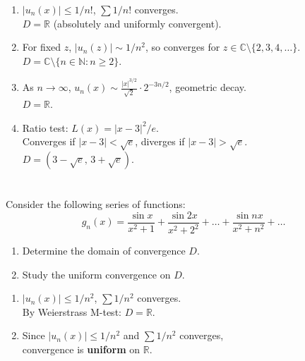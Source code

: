 \documentclass[12pt]{article}
\begin{document}
\begin{correctionbox}
\begin{enumerate}
    \item $|u_n(x)|\leq 1/n!$, $\sum 1/n!$ converges. \\
    $D = \mathbb{R}$ (absolutely and uniformly convergent).

    \item For fixed $z$, $|u_n(z)|\sim 1/n^2$, so converges for $z\in\mathbb{C}\setminus\{2,3,4,\dots\}$. \\
    $D = \mathbb{C}\setminus\{n\in\mathbb{N} : n\geq2\}$.

    \item As $n\to\infty$, $u_n(x) \sim \frac{|x|^{3/2}}{\sqrt{2}}\cdot 2^{-3n/2}$, geometric decay. \\
    $D = \mathbb{R}$.

    \item Ratio test: $L(x)=|x-3|^2/e$. \\
    Converges if $|x-3|<\sqrt{e}$, diverges if $|x-3|>\sqrt{e}$. \\
    $D = (3-\sqrt{e},\,3+\sqrt{e})$.
\end{enumerate}
\end{correctionbox}

\section{}
Consider the following series of functions: 
$$g_n(x) = \frac{\sin x}{x^2+1} + \frac{\sin 2x}{x^2+2^2} + \ldots + \frac{\sin nx}{x^2+n^2} + \ldots$$

\begin{enumerate}
    \item Determine the domain of convergence $D$.
    \item Study the uniform convergence on $D$.
\end{enumerate}

\begin{correctionbox}
\begin{enumerate}
    \item $|u_n(x)| \leq 1/n^2$, $\sum 1/n^2$ converges. \\
    By Weierstrass M-test: $D = \mathbb{R}$.

    \item Since $|u_n(x)|\leq 1/n^2$ and $\sum 1/n^2$ converges, \\
    convergence is \textbf{uniform} on $\mathbb{R}$.
\end{enumerate}
\end{correctionbox}
\end{document}
